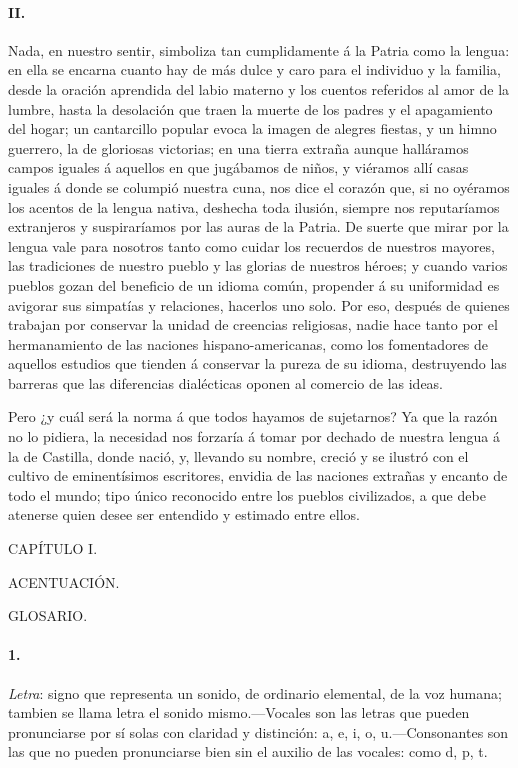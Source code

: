\documentclass{book}
\begin{document}
\paragraph{II.}

Nada, en nuestro sentir, simboliza tan cumplidamente á la Patria como la lengua: en ella se 
encarna cuanto hay de más dulce y caro para el individuo y la familia, desde la oración 
aprendida del labio materno y los cuentos referidos al amor de la lumbre, hasta la desolación 
que traen la muerte de los padres y el apagamiento del hogar; un cantarcillo popular evoca la 
imagen de alegres fiestas, y un himno guerrero, la de gloriosas victorias; en una tierra 
extraña aunque halláramos campos iguales á aquellos en que jugábamos de niños, y viéramos allí 
casas iguales á donde se columpió nuestra cuna, nos dice el corazón que, si no oyéramos los 
acentos de la lengua nativa, deshecha toda ilusión, siempre nos reputaríamos extranjeros y 
suspiraríamos por las auras de la Patria. De suerte que mirar por la lengua vale para nosotros 
tanto como cuidar los recuerdos de nuestros mayores, las tradiciones de nuestro pueblo y las 
glorias de nuestros héroes; y cuando varios pueblos gozan del beneficio de un idioma común, 
propender á su uniformidad es avigorar sus simpatías y relaciones, hacerlos uno solo. Por eso, 
después de quienes trabajan por conservar la unidad de creencias religiosas, nadie hace tanto 
por el hermanamiento de las naciones hispano-americanas, como los fomentadores de aquellos 
estudios que tienden á conservar la pureza de su idioma, destruyendo las barreras que las 
diferencias dialécticas oponen al comercio de las ideas. 

Pero ¿y cuál será la norma á que todos hayamos de sujetarnos? Ya que la razón no lo pidiera, la 
necesidad nos forzaría á tomar por dechado de nuestra lengua á la de Castilla, donde nació, y, 
llevando su nombre, creció y se ilustró con el cultivo de eminentísimos escritores, envidia de 
las naciones extrañas y encanto de todo el mundo; tipo único reconocido entre los pueblos 
civilizados, a que debe atenerse quien desee ser entendido y estimado entre ellos.

CAPÍTULO I.

ACENTUACIÓN.

GLOSARIO.

\paragraph{1.} \emph{Letra}: signo que representa un sonido, de ordinario elemental, de la voz humana; tambien se llama letra el sonido mismo.---Vocales son las letras que pueden pronunciarse por sí solas con claridad y distinción: a, e, i, o, u.---Consonantes son las que no pueden pronunciarse bien sin el auxilio de las vocales: como d, p, t.
\end{document}
